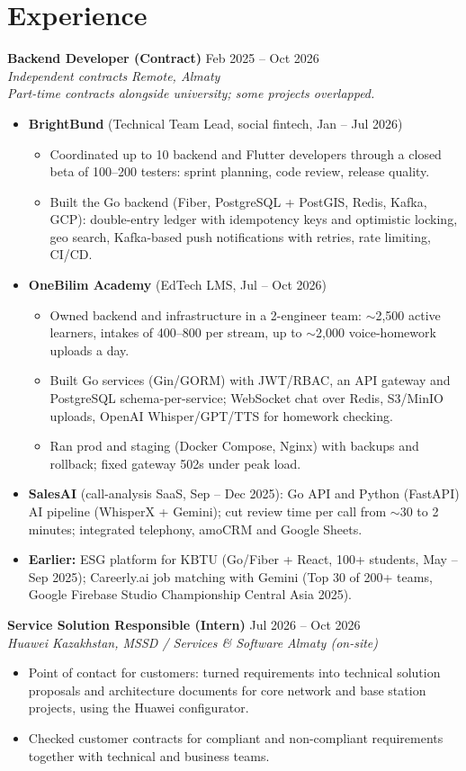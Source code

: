 \documentclass[10pt,a4paper]{article}
\newcommand{\resumeEntry}[4]{%
  \textbf{#1} \hfill #2\\
  \textit{#3} \hfill \textit{#4}\vspace{-2pt}
}
\begin{document}
\section{Experience}
\resumeEntry{Backend Developer (Contract)}{Feb 2025 -- Oct 2026}{Independent contracts}{Remote, Almaty}\\
\textit{Part-time contracts alongside university; some projects overlapped.}
\begin{itemize}
  \item \textbf{BrightBund} (Technical Team Lead, social fintech, Jan -- Jul 2026)
  \begin{itemize}
    \item Coordinated up to 10 backend and Flutter developers through a closed beta of 100--200 testers: sprint planning, code review, release quality.
    \item Built the Go backend (Fiber, PostgreSQL + PostGIS, Redis, Kafka, GCP): double-entry ledger with idempotency keys and optimistic locking, geo search, Kafka-based push notifications with retries, rate limiting, CI/CD.
  \end{itemize}
  \item \textbf{OneBilim Academy} (EdTech LMS, Jul -- Oct 2026)
  \begin{itemize}
    \item Owned backend and infrastructure in a 2-engineer team: $\sim$2,500 active learners, intakes of 400--800 per stream, up to $\sim$2,000 voice-homework uploads a day.
    \item Built Go services (Gin/GORM) with JWT/RBAC, an API gateway and PostgreSQL schema-per-service; WebSocket chat over Redis, S3/MinIO uploads, OpenAI Whisper/GPT/TTS for homework checking.
    \item Ran prod and staging (Docker Compose, Nginx) with backups and rollback; fixed gateway 502s under peak load.
  \end{itemize}
  \item \textbf{SalesAI} (call-analysis SaaS, Sep -- Dec 2025): Go API and Python (FastAPI) AI pipeline (WhisperX + Gemini); cut review time per call from $\sim$30 to 2 minutes; integrated telephony, amoCRM and Google Sheets.
  \item \textbf{Earlier:} ESG platform for KBTU (Go/Fiber + React, 100+ students, May -- Sep 2025); Careerly.ai job matching with Gemini (Top 30 of 200+ teams, Google Firebase Studio Championship Central Asia 2025).
\end{itemize}

\resumeEntry{Service Solution Responsible (Intern)}{Jul 2026 -- Oct 2026}{Huawei Kazakhstan, MSSD / Services \& Software}{Almaty (on-site)}
\begin{itemize}
  \item Point of contact for customers: turned requirements into technical solution proposals and architecture documents for core network and base station projects, using the Huawei configurator.
  \item Checked customer contracts for compliant and non-compliant requirements together with technical and business teams.
\end{itemize}
\end{document}
